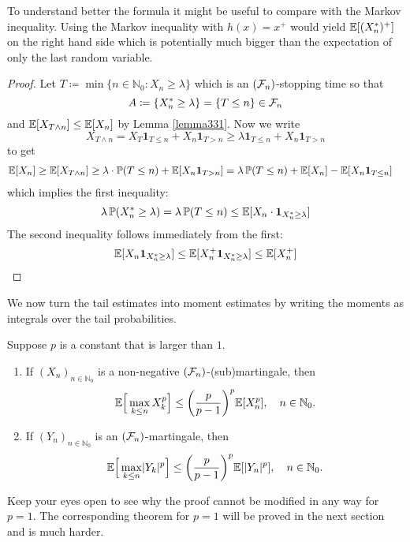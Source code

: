 To understand better the formula it might be useful to compare with the Markov inequality. Using the Markov inequality with $h(x)=x^+$ would yield $\mathbb{E}[(X^*_n)^+]$ on the right hand side which is potentially much bigger than the expectation of only the last random variable.

\begin{proof}[Proof]
	Let $T \coloneqq \min\{ n\in\mathbb{N}_0 \colon X_n \geq \lambda \}$ which is an $(\mathcal{F}_n)$-stopping time so that $$A \coloneqq \{ X_n^*\geq \lambda \} = \{T \leq n \} \in \mathcal{F}_n$$ and  $ \mathbb{E}[X_{T\wedge n}] \leq \mathbb{E}[X_n]$ by  Lemma \ref{lemma331}.
	  Now we write $$ X_{T \wedge n} = X_T \mathbf 1_{T \leq n}+ X_n \mathbf 1_{T>n}\geq \lambda \mathbf 1_{T \leq n} + X_n \mathbf 1_{T > n}$$ to get
	\begin{align*}
		\mathbb{E}[X_n] \geq \mathbb{E}[X_{T\wedge n}] &\geq \lambda \cdot \mathbb{P}(T\leq n) + \mathbb{E}[X_n \mathbf 1_{T>n}] 
		=\lambda \,\mathbb{P}(T\leq n) + \mathbb{E}[X_n] - \mathbb{E}[X_n \mathbf 1_{T\leq n}]
	\end{align*}
	which implies the first inequality: $$\lambda\, \mathbb{P}(X_n^* \geq \lambda) = \lambda \,\mathbb{P}(T \leq n ) \leq \mathbb{E}[X_n \cdot \mathbf 1_{X_n^*\geq \lambda}]$$
	The second inequality follows immediately from the first: $$ \mathbb{E}[X_n \mathbf 1_{X_n^*\geq \lambda}] \leq \mathbb{E}[X_n^+\mathbf 1_{X_n^*\geq \lambda}] \leq \mathbb{E}[X_n^+]$$
\end{proof}
We now turn the tail estimates into moment estimates by writing the moments as integrals over the tail probabilities.
\begin{lsatz}
\begin{theorem}\label{max_inequality}
	Suppose $p$ is a constant that is \underline{} larger than $1$.
	\begin{enumerate}[label=(\roman*)]
		\item
			If $(X_n)_{n\in\mathbb{N}_0}$ is a non-negative $(\mathcal{F}_n)$-(sub)martingale, then $$ \mathbb{E}\Big[ \max\limits_{k \leq n} X_k^p\Big] \leq \bigg(\frac{p}{p-1}\bigg)^p \mathbb{E}[X_n^p], \quad n\in \mathbb{N}_0.$$
		\item
			If $(Y_n)_{n\in{\mathbb N}_0}$ is an $(\mathcal{F}_n)$-martingale, then $$ \mathbb{E}\Big[ \max\limits_{k \leq n} \lvert Y_k\rvert^p \Big] \leq \bigg(\frac{p}{p-1}\bigg)^p \mathbb{E}[\lvert Y_n\rvert^p],\quad n\in \mathbb{N}_0.$$
	\end{enumerate}
\end{theorem}
\end{lsatz}
Keep your eyes open to see why the proof cannot be modified in any way for $p=1$. The corresponding theorem for $p=1$ will be proved in the next section and is much harder.
